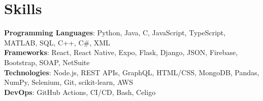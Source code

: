 \section{Skills}
    \begin{itemize}[leftmargin=0.15in, label={}]
	\small{\item{
		\textbf{Programming Languages}{: Python, Java, C, JavaScript, TypeScript, MATLAB, SQL, C++, C\#, XML} \\
		\textbf{Frameworks}{: React, React Native, Expo, Flask, Django, JSON, Firebase, Bootstrap, SOAP, NetSuite} \\
		\textbf{Technologies}{: Node.js, REST APIs, GraphQL,  HTML/CSS, MongoDB, Pandas, NumPy, Selenium, Git, scikit-learn, AWS} \\
		\textbf{DevOps}{: GitHub Actions, CI/CD, Bash, Celigo} \\
	}}
    \end{itemize}
